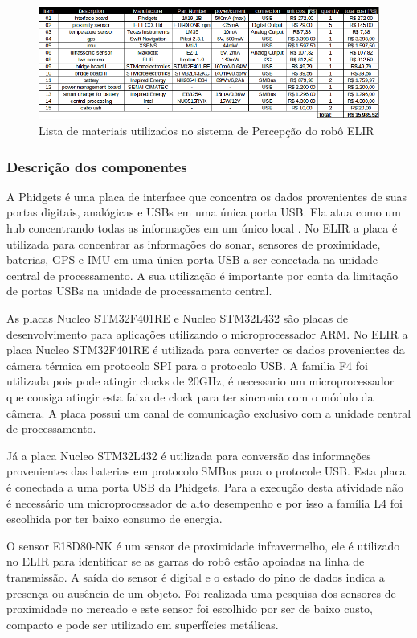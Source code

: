 \begin{figure}[h]
	\centering
	\includegraphics[width=16cm]{Figures/lista_materiais.png}
	\caption{Lista de materiais utilizados no sistema de Percepção do robô ELIR}
	\label{fig:list_mat}
\end{figure}

\subsubsection{Descrição dos componentes}

A Phidgets é uma placa de interface que concentra os dados provenientes de suas portas digitais, analógicas e USBs em uma única porta USB. Ela atua como um hub concentrando todas as informações em um único local . No ELIR a placa é utilizada para concentrar as informações do sonar, sensores de proximidade,  baterias, GPS e IMU em uma única porta USB a ser conectada na unidade central de processamento. A sua utilização é importante por conta da limitação de portas USBs na unidade de processamento central.

As placas Nucleo STM32F401RE  e   Nucleo STM32L432 são placas de desenvolvimento para aplicações utilizando o microprocessador ARM. No ELIR a placa Nucleo STM32F401RE é utilizada para converter os dados provenientes da câmera térmica em protocolo SPI para o protocolo USB. A familia  F4 foi utilizada pois pode atingir clocks de 20GHz, é necessario um microprocessador que consiga atingir esta faixa de clock para ter sincronia com o módulo da câmera. A placa possui um canal de comunicação exclusivo com a unidade central de processamento. 

Já a placa  Nucleo STM32L432 é utilizada para conversão das informações provenientes das baterias em protocolo SMBus para o protocole USB. Esta placa é conectada a uma porta USB da Phidgets. Para a execução desta atividade não é necessário um microprocessador de alto desempenho e por isso a família L4 foi escolhida por ter  baixo consumo de energia.

O sensor E18D80-NK é um sensor de proximidade infravermelho, ele é utilizado no ELIR para identificar se as garras do robô estão apoiadas na linha de transmissão. A saída do sensor é digital e o estado do pino  de dados indica a presença ou ausência de um objeto. Foi realizada uma pesquisa dos sensores de proximidade no mercado e este sensor foi escolhido por ser de baixo custo, compacto e pode ser utilizado em superfícies metálicas. 

